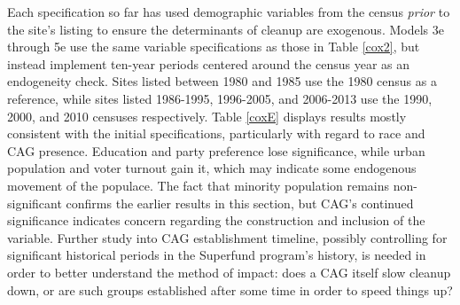 \documentclass[12pt]{article}
\begin{document}
{%
Each specification so far has used demographic variables from the census \emph{prior} to the site's listing to ensure the determinants of cleanup are exogenous. Models 3e through 5e use the same variable specifications as those in Table \ref{cox2}, but instead implement ten-year periods centered around the census year as an endogeneity check. Sites listed between 1980 and 1985 use the 1980 census as a reference, while sites listed 1986-1995, 1996-2005, and 2006-2013 use the 1990, 2000, and 2010 censuses respectively. Table \ref{coxE} displays results mostly consistent with the initial specifications, particularly with regard to race and CAG presence. Education and party preference lose significance, while urban population and voter turnout gain it, which may indicate some endogenous movement of the populace. The fact that minority population remains non-significant confirms the earlier results in this section, but CAG's continued significance indicates concern regarding the construction and inclusion of the variable. Further study into CAG establishment timeline, possibly controlling for significant historical periods in the Superfund program's history, is needed in order to better understand the method of impact: does a CAG itself slow cleanup down, or are such groups established after some time in order to speed things up?

}
\end{document}
